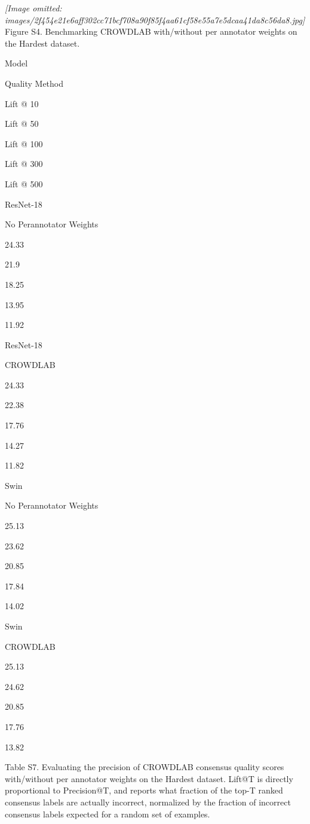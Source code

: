 \documentclass[
]{article}
\begin{document}
\textit{[Image omitted: images/2f454e21e6aff302cc71bcf708a90f85f4aa61cf58e55a7e5dcaa41da8c56da8.jpg]}\\
Figure S4. Benchmarking CROWDLAB with/without per annotator weights on
the Hardest dataset.

Model

Quality Method

Lift @ 10

Lift @ 50

Lift @ 100

Lift @ 300

Lift @ 500

ResNet-18

No Perannotator Weights

24.33

21.9

18.25

13.95

11.92

ResNet-18

CROWDLAB

24.33

22.38

17.76

14.27

11.82

Swin

No Perannotator Weights

25.13

23.62

20.85

17.84

14.02

Swin

CROWDLAB

25.13

24.62

20.85

17.76

13.82

Table S7. Evaluating the precision of CROWDLAB consensus quality scores
with/without per annotator weights on the Hardest dataset. Lift@T is
directly proportional to Precision@T, and reports what fraction of the
top-T ranked consensus labels are actually incorrect, normalized by the
fraction of incorrect consensus labels expected for a random set of
examples.
\end{document}
